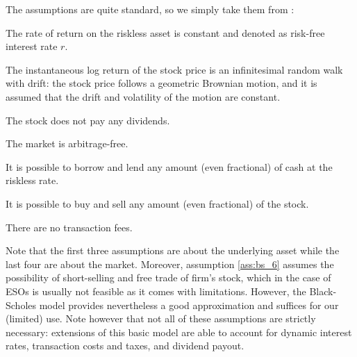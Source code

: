     The assumptions are quite standard, so we simply take them from \cite{wiki:blackscholes}:

    \begin{assumption}
        \label{ass:bs_1}
        The rate of return on the riskless asset is constant and denoted as risk-free interest rate $r$.
    \end{assumption}
    

    \begin{assumption}
        \label{ass: bs_2}
        The instantaneous log return of the stock price is an infinitesimal random walk with drift: the stock price follows a geometric Brownian motion, and it is assumed that the drift and volatility of the motion are constant.
    \end{assumption}

    \begin{assumption}
        \label{ass:bs_3}
        The stock does not pay any dividends.
    \end{assumption}

    \begin{assumption}
        \label{ass:bs_4}
        The market is arbitrage-free.
    \end{assumption}

    \begin{assumption}
        \label{ass:bs_5}
        It is possible to borrow and lend any amount (even fractional) of cash at the riskless rate.
    \end{assumption}

    \begin{assumption}
        \label{ass:bs_6}
        It is possible to buy and sell any amount (even fractional) of the stock.
    \end{assumption}
    
    \begin{assumption}
        \label{ass:bs_7}
        There are no transaction fees.
    \end{assumption}
    
    Note that the first three assumptions are about the underlying asset while the last four are about the market. Moreover, assumption \ref*{ass:bs_6} assumes the possibility of short-selling and free trade of firm's stock, which in the case of ESOs is usually not feasible as it comes with limitations. However, the Black-Scholes model provides nevertheless a good approximation and suffices for our (limited) use. Note however that not all of these assumptions are strictly necessary: extensions of this basic model are able to account for dynamic interest rates, transaction costs and taxes, and dividend payout.  

